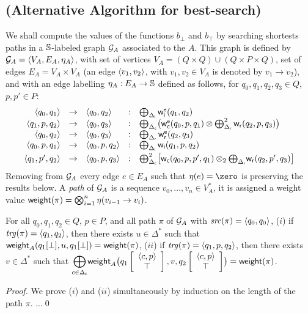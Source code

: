 %

\subsection*{(Alternative Algorithm for best-search)}
We shall compute the values of the functions $b_\bot$ and $b_\top$
by searching shortests paths in a $\mathbb{S}$-labeled graph $\mathcal{G}_A$
associated to the \SWVPA $A$. 
This graph is defined by $\G_A = \< V_A, E_A, \eta_A >$, 
with set of vertices $V_A = (Q \times Q) \cup (Q \times P \times Q)$,
set of edges $E_A = V_A \times V_A$
(an edge $\< v_1, v_2>$, with $v_1, v_2 \in V_A$ is denoted by $v_1 \to v_2$),
and with an edge labelling  
$\eta_A : E_A \to \mathbb{S}$ defined as follows,
for $q_0, q_1, q_2, q_3 \in Q$, $p, p' \in P$:
%
\[
\begin{array}{rclcl}
\< q_0, q_1> & \to & \< q_0, q_2> & : &
\bigoplus_{\Deltai} \weiei(q_1, q_2)\\
%
\< q_1, p, q_2> & \to & \<q_0, q_3> & : &
\bigoplus_{\Deltac} \bigl( \weiec(q_0, p, q_1) \otimes \bigoplus^2_{\Deltar} \weir(q_2, p, q_3)\bigr)\\ 
%
\< q_0, q_2> & \to & \< q_0, q_3> & : & 
\bigoplus_{\Deltar} \weier(q_2, q_3)\\
% 
\< q_0, p, q_1> & \to & \< q_0, p, q_2> & : &
\bigoplus_{\Deltai} \weii(q_1, p, q_2)\\[1mm]
%
\< q_1, p', q_2> & \to & \< q_0, p, q_3> & : &
\bigoplus^2_{\Deltac} \bigl[ \weic(q_0, p, p', q_1) \otimes_2 {\bigoplus_{\Deltar}} \weir(q_2, p', q_3) \bigr]\\
\end{array}
\]
Removing from $\mathcal{G}_A$ every edge $e \in E_A$ such that $\eta(e) = \zero$ 
is preserving the results below.
%
A \emph{path} of $\mathcal{G}_A$ is a sequence $v_0,\ldots, v_n \in V^*_A$,
it is assigned a weight value $\mathsf{weight}(\pi) = \bigotimes_{i=1}^{n} \eta(v_{i-1} \to v_i)$.

\begin{lemma}[Correctness]
For all $q_0, q_1, q_2 \in Q$, $p\in P$, 
and all path $\pi$ of $\mathcal{G}_A$ with $\src(\pi) = \<q_0, q_0>$,
($i$) if $\trg(\pi) = \< q_1, q_2>$, 
then there exists $u \in \Delta^*$ such that 
$\mathsf{weight}_A(q_1[\bot], u, q_1[\bot]) = \mathsf{weight}(\pi)$,
%
($ii$) if $\trg(\pi) = \< q_1, p, q_2>$,
then there exists $v \in \Delta^*$ such that 
${\displaystyle\bigoplus_{c \in \Deltac}}
 \weight_A\bigl(\configup{q_1}{\< c, p> \stackup \top }, v, \configup{q_2}{\<c, p> \stackup \top}\bigr)
 = \weight(\pi)$.
\end{lemma}
%
\begin{proof}
We prove ($i$) and ($ii$) simultaneously by induction on the length of the path $\pi$.
...\qed
\end{proof}



